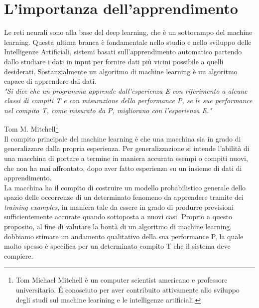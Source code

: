 \section{L'importanza dell'apprendimento}

Le reti neurali sono alla base del deep learning, che è un sottocampo del machine learning.
Questa ultima branca è fondamentale nello studio e nello sviluppo delle Intelligenze Artificiali, sistemi basati sull’apprendimento automatico partendo dallo studiare i dati in input per fornire dati più vicini possibile a quelli desiderati. 
Sostanzialmente un algoritmo di machine learning è un algoritmo capace di apprendere dai dati. \\

\emph{"Si dice che un programma apprende dall'esperienza E con riferimento a alcune classi di
 compiti T e con misurazione della performance P, se le sue performance nel compito T, come misurato da P,
  migliorano con l'esperienza E." } 

Tom M. Mitchell\footnote{Tom Michael Mitchell è un computer scientist americano e professore universitario. É conosciuto per aver contribuito attivamente allo sviluppo degli studi sul machine learining e le intelligenze artificiali.} \\

Il compito principale del machine learning è che una macchina sia in grado di generalizzare
 dalla propria esperienza. Per generalizzazione si intende l'abilità di una macchina di portare a
  termine in maniera accurata esempi o compiti nuovi, che non ha mai affrontato, 
  dopo aver fatto esperienza su un insieme di dati di apprendimento.\\
La macchina ha il compito di costruire un modello probabilistico generale dello spazio delle 
occorrenze di un determinato fenomeno da apprendere tramite dei \emph{training examples}, in maniera 
tale da essere in grado di produrre previsioni sufficientemente accurate quando sottoposta a nuovi casi. 
Proprio a questo proposito, al fine di valutare la bontà di un algoritmo di machine learning,
 dobbiamo stimare un andamento qualitativo della sua performance P, la quale molto spesso è specifica 
 per un determinato compito T che il sistema deve compiere. 

